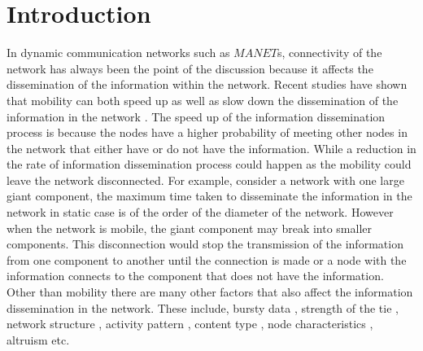 \documentclass[preprint, twocolumn,5p]{elsarticle}
\begin{document}
\section{Introduction}\label{sec:introduction}

In dynamic communication networks such as $MANET$s, connectivity of the network has always been the point of the discussion because it affects the dissemination of the information within the network. Recent studies have shown that mobility can both speed up as well as slow down the dissemination of the information in the network \cite{Kivela2012}. The speed up of the information dissemination process is because the nodes have a higher probability of meeting other nodes in the network that either have or do not have the information. While a reduction in the rate of information dissemination process could happen as the mobility could leave the network disconnected. For example, consider a network with one large giant component, the maximum time taken to disseminate the information in the network in static case is of the order of the diameter of the network. However when the network is mobile, the giant component may break into smaller components. This disconnection would stop the transmission of the information from one component to another until the connection is made or a node with the information connects to the component that does not have the information. Other than mobility there are many other factors that also affect the information dissemination in the network. These include, bursty data \cite{Karsai2011}, strength of the tie \cite{Miritello2011}, network structure \cite{Nicosia2011}, activity pattern \cite{Vazquez2007}, content type \cite{Wang2009}, node characteristics \cite{Wang2011a}, altruism \cite{Hui2009} etc.
\end{document}
